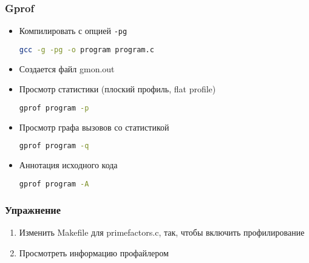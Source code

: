 \begin{frame}[fragile]
 \frametitle{Gprof}
 \begin{itemize}
   \item Компилировать с опцией \texttt{-pg}
\begin{lstlisting}[language=sh]
 gcc -g -pg -o program program.c
\end{lstlisting}
   \item Создается файл gmon.out
   \item Просмотр статистики (плоский профиль, flat profile) 
\begin{lstlisting}[language=sh]
gprof program -p
\end{lstlisting}
    \item Просмотр графа вызовов со статистикой
\begin{lstlisting}[language=sh]
gprof program -q
\end{lstlisting}
    \item Аннотация исходного кода
\begin{lstlisting}[language=sh]
gprof program -A
\end{lstlisting}
 \end{itemize}
\end{frame}

\begin{frame}
  \frametitle{Упражнение}
  \begin{enumerate}
    \item Изменить Makefile для primefactors.c, так, чтобы включить профилирование
    \item Просмотреть информацию профайлером
  \end{enumerate}
\end{frame}

